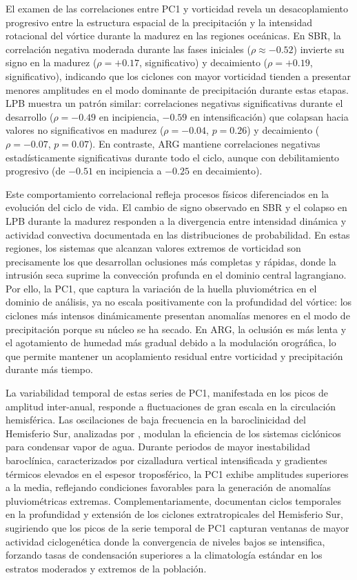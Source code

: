 El examen de las correlaciones entre PC1 y vorticidad revela un desacoplamiento progresivo entre la estructura espacial de la precipitación y la intensidad rotacional del vórtice durante la madurez en las regiones oceánicas. En SBR, la correlación negativa moderada durante las fases iniciales ($\rho \approx -0.52$) invierte su signo en la madurez ($\rho = +0.17$, significativo) y decaimiento ($\rho = +0.19$, significativo), indicando que los ciclones con mayor vorticidad tienden a presentar menores amplitudes en el modo dominante de precipitación durante estas etapas. LPB muestra un patrón similar: correlaciones negativas significativas durante el desarrollo ($\rho = -0.49$ en incipiencia, $-0.59$ en intensificación) que colapsan hacia valores no significativos en madurez ($\rho = -0.04$, $p = 0.26$) y decaimiento ($\rho = -0.07$, $p = 0.07$). En contraste, ARG mantiene correlaciones negativas estadísticamente significativas durante todo el ciclo, aunque con debilitamiento progresivo (de $-0.51$ en incipiencia a $-0.25$ en decaimiento).

Este comportamiento correlacional refleja procesos físicos diferenciados en la evolución del ciclo de vida. El cambio de signo observado en SBR y el colapso en LPB durante la madurez responden a la divergencia entre intensidad dinámica y actividad convectiva documentada en las distribuciones de probabilidad. En estas regiones, los sistemas que alcanzan valores extremos de vorticidad son precisamente los que desarrollan oclusiones más completas y rápidas, donde la intrusión seca suprime la convección profunda en el dominio central lagrangiano. Por ello, la PC1, que captura la variación de la huella pluviométrica en el dominio de análisis, ya no escala positivamente con la profundidad del vórtice: los ciclones más intensos dinámicamente presentan anomalías menores en el modo de precipitación porque su núcleo se ha secado. En ARG, la oclusión es más lenta y el agotamiento de humedad más gradual debido a la modulación orográfica, lo que permite mantener un acoplamiento residual entre vorticidad y precipitación durante más tiempo.

La variabilidad temporal de estas series de PC1, manifestada en los picos de amplitud inter-anual, responde a fluctuaciones de gran escala en la circulación hemisférica. Las oscilaciones de baja frecuencia en la baroclinicidad del Hemisferio Sur, analizadas por \citet{machado2020influence}, modulan la eficiencia de los sistemas ciclónicos para condensar vapor de agua. Durante periodos de mayor inestabilidad baroclínica, caracterizados por cizalladura vertical intensificada y gradientes térmicos elevados en el espesor troposférico, la PC1 exhibe amplitudes superiores a la media, reflejando condiciones favorables para la generación de anomalías pluviométricas extremas. Complementariamente, \citet{simmonds2000variability} documentan ciclos temporales en la profundidad y extensión de los ciclones extratropicales del Hemisferio Sur, sugiriendo que los picos de la serie temporal de PC1 capturan ventanas de mayor actividad ciclogenética donde la convergencia de niveles bajos se intensifica, forzando tasas de condensación superiores a la climatología estándar en los estratos moderados y extremos de la población.

